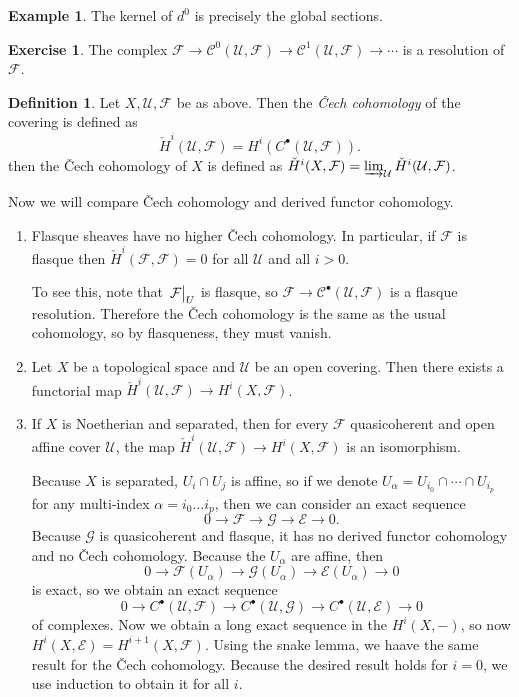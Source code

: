 \documentclass[leqno, openany]{memoir}
\theoremstyle{definition}
\newtheorem{defn}[thm]{Definition}
\newtheorem{exm}[thm]{Example}
\newtheorem{exer}[thm]{Exercise}
\theoremstyle{remark}
\theoremstyle{plain}
\theoremstyle{definition}
\theoremstyle{remark}
\newcommand{\mc}[1]{\mathcal{#1}}
\begin{document}
\begin{exm}
    The kernel of $d^0$ is precisely the global sections.
\end{exm}

\begin{exer}
    The complex $\mc{F} \to \mc{C}^0(\mc{U}, \mc{F}) \to \mc{C}^1(\mc{U}, \mc{F}) \to \cdots$ is a resolution of $\mc{F}$.
\end{exer}

\begin{defn}
    Let $X, \mc{U}, \mc{F}$ be as above. Then the \textit{\v{C}ech cohomology} of the covering is defined as 
    \[ \check{H}^i(\mc{U}, \mc{F}) = H^i(C^{\bullet}(\mc{U}, \mc{F})). \]
    then the \v{C}ech cohomology of $X$ is defined as $\check{H}^i(X, \mc{F}) = \varinjlim_{\mc{U}} \check{H}^i(\mc{U}, \mc{F})$.
\end{defn}

Now we will compare \v{C}ech cohomology and derived functor cohomology.
\begin{enumerate}
    \item Flasque sheaves have no higher \v{C}ech cohomology. In particular, if $\mc{F}$ is flasque then $\check{H}^i(\mc{F}, \mc{F}) = 0$ for all $\mc{U}$ and all $i > 0$.

        To see this, note that $\eval{\mc{F}}_U$ is flasque, so $\mc{F} \to \mc{C}^{\bullet}(\mc{U}, \mc{F})$ is a flasque resolution. Therefore the \v{C}ech cohomology is the same as the usual cohomology, so by flasqueness, they must vanish.
    \item Let $X$ be a topological space and $\mc{U}$ be an open covering. Then there exists a functorial map $\check{H}^i(\mc{U}, \mc{F}) \to H^i(X, \mc{F})$.
    \item If $X$ is Noetherian and separated, then for every $\mc{F}$ quasicoherent and open affine cover $\mc{U}$, the map $\check{H}^i(\mc{U}, \mc{F}) \to H^i(X, \mc{F})$ is an isomorphism.

        Because $X$ is separated, $U_i \cap U_j$ is affine, so if we denote $U_{\alpha} = U_{i_0} \cap \cdots \cap U_{i_p}$ for any multi-index $\alpha = i_0 \ldots i_p$, then we can consider an exact sequence
        \[ 0 \to \mc{F} \to \mc{G} \to \mc{E} \to 0. \]
        Because $\mc{G}$ is quasicoherent and flasque, it has no derived functor cohomology and no \v{C}ech cohomology. Because the $U_{\alpha}$ are affine, then
        \[ 0 \to \mc{F}(U_{\alpha}) \to \mc{G}(U_{\alpha}) \to \mc{E}(U_{\alpha}) \to 0 \]
        is exact, so we obtain an exact sequence
        \[ 0 \to C^{\bullet}(\mc{U}, \mc{F}) \to C^{\bullet}(\mc{U}, \mc{G}) \to C^{\bullet}(\mc{U}, \mc{E}) \to 0 \]
        of complexes. Now we obtain a long exact sequence in the $H^i(X,-)$, so now $H^i(X, \mc{E}) = H^{i+1}(X, \mc{F})$. Using the snake lemma, we haave the same result for the \v{C}ech cohomology. Because the desired result holds for $i=0$, we use induction to obtain it for all $i$.
\end{enumerate}
\end{document}
